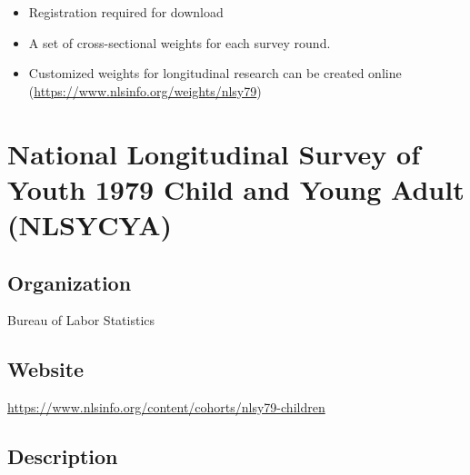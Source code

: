 \documentclass[
]{book}
\providecommand{\tightlist}{%
  \setlength{\itemsep}{0pt}\setlength{\parskip}{0pt}}
\begin{document}
\begin{itemize}
\tightlist
\item
  Registration required for download
\item
  A set of cross-sectional weights for each survey round.
\item
  Customized weights for longitudinal research can be created online (\url{https://www.nlsinfo.org/weights/nlsy79})
\end{itemize}

\mainmatter

\hypertarget{national-longitudinal-survey-of-youth-1979-child-and-young-adult-nlsycya}{%
\chapter{National Longitudinal Survey of Youth 1979 Child and Young Adult (NLSYCYA)}\label{national-longitudinal-survey-of-youth-1979-child-and-young-adult-nlsycya}}

\hypertarget{organization-58}{%
\section{Organization}\label{organization-58}}

Bureau of Labor Statistics

\hypertarget{website-58}{%
\section{Website}\label{website-58}}

\url{https://www.nlsinfo.org/content/cohorts/nlsy79-children}

\hypertarget{description-58}{%
\section{Description}\label{description-58}}
\end{document}
